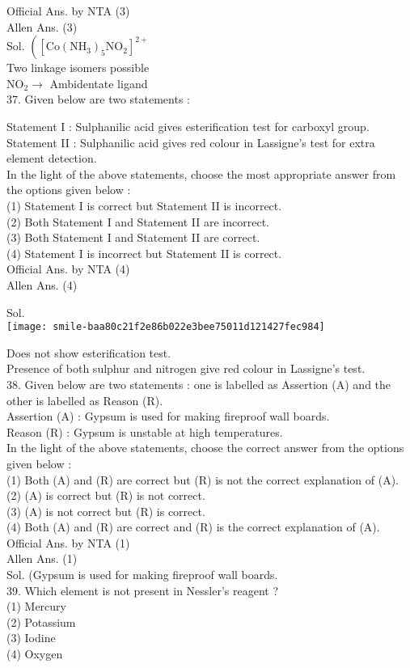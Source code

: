 \documentclass[10pt]{article}
\begin{document}
Official Ans. by NTA (3)\\
Allen Ans. (3)\\
Sol. \(\left(\left[\mathrm{Co}\left(\mathrm{NH}_{3}\right)_{5} \mathrm{NO}_{2}\right]^{2+}\right.\)\\
Two linkage isomers possible\\
\(\mathrm{NO}_{2} \rightarrow\) Ambidentate ligand\\
37. Given below are two statements :

Statement I : Sulphanilic acid gives esterification test for carboxyl group.\\
Statement II : Sulphanilic acid gives red colour in Lassigne's test for extra element detection.\\
In the light of the above statements, choose the most appropriate answer from the options given below :\\
(1) Statement I is correct but Statement II is incorrect.\\
(2) Both Statement I and Statement II are incorrect.\\
(3) Both Statement I and Statement II are correct.\\
(4) Statement I is incorrect but Statement II is correct.\\
Official Ans. by NTA (4)\\
Allen Ans. (4)

Sol.\\
\texttt{[image: smile-baa80c21f2e86b022e3bee75011d121427fec984]}

Does not show esterification test.\\
Presence of both sulphur and nitrogen give red colour in Lassigne's test.\\
38. Given below are two statements : one is labelled as Assertion (A) and the other is labelled as Reason (R).\\
Assertion (A) : Gypsum is used for making fireproof wall boards.\\
Reason (R) : Gypsum is unstable at high temperatures.\\
In the light of the above statements, choose the correct answer from the options given below :\\
(1) Both (A) and (R) are correct but (R) is not the correct explanation of (A).\\
(2) (A) is correct but (R) is not correct.\\
(3) (A) is not correct but (R) is correct.\\
(4) Both (A) and (R) are correct and (R) is the correct explanation of (A).\\
Official Ans. by NTA (1)\\
Allen Ans. (1)\\
Sol. (Gypsum is used for making fireproof wall boards.\\
39. Which element is not present in Nessler's reagent ?\\
(1) Mercury\\
(2) Potassium\\
(3) Iodine\\
(4) Oxygen
\end{document}

